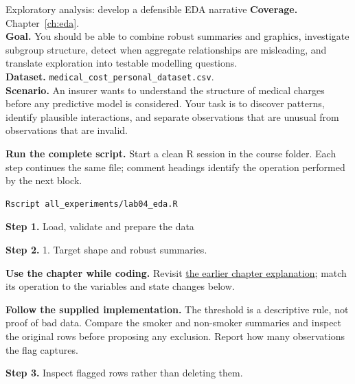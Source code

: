 
\begin{labproject}{Exploratory analysis: develop a defensible EDA narrative}
\textbf{Coverage.} Chapter~\ref{ch:eda}.\\
\textbf{Goal.} You should be able to combine robust summaries and graphics, investigate subgroup structure, detect when aggregate relationships are misleading, and translate exploration into testable modelling questions.\\
\textbf{Dataset.} \texttt{medical\_cost\_personal\_dataset.csv}.\\
\textbf{Scenario.} An insurer wants to understand the structure of medical charges before any predictive model is considered. Your task is to discover patterns, identify plausible interactions, and separate observations that are unusual from observations that are invalid.



\textbf{Run the complete script.} Start a clean R session in the course folder. Each step continues the same file; comment headings identify the operation performed by the next block.
\begin{lstlisting}[style=utpterminal]
Rscript all_experiments/lab04_eda.R
\end{lstlisting}

\noindent\textbf{Step 1.} Load, validate and prepare the data


\noindent\textbf{Step 2.} 1. Target shape and robust summaries.



\textbf{Use the chapter while coding.} Revisit \hyperref[ch:eda]{the earlier chapter explanation}; match its operation to the variables and state changes below.

\textbf{Follow the supplied implementation.} The threshold is a descriptive rule, not proof of bad data. Compare the smoker and non-smoker summaries and inspect the original rows before proposing any exclusion. Report how many observations the flag captures.




\noindent\textbf{Step 3.} Inspect flagged rows rather than deleting them.



\end{labproject}
